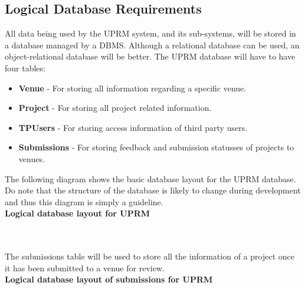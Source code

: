	\subsection{Logical Database Requirements}
		All data being used by the UPRM system, and its sub-systems, will be stored in a database managed by a DBMS. Although a relational database can be used, an object-relational database will be better. The UPRM database will have to have four tables:
		\begin{itemize}
			\item \textbf{Venue} - For storing all information regarding a specific venue.
			\item \textbf{Project} - For storing all project related information.
			\item \textbf{TPUsers} - For storing access information of third party users.
			\item \textbf{Submissions} - For storing feedback and submission statusses of projects to venues.
		\end{itemize}
		
		The following diagram shows the basic database layout for the UPRM database. Do note that the structure of the database is likely to change during development and thus this diagram is simply a guideline.\\
		\textbf{Logical database layout for UPRM}\\
		\centerline{} \\ \\
		The submissions table will be used to store all the information of a project once it has been submitted to a venue for review.\\
		\textbf{Logical database layout of submissions for UPRM}\\
		\centerline{} \\ \\
